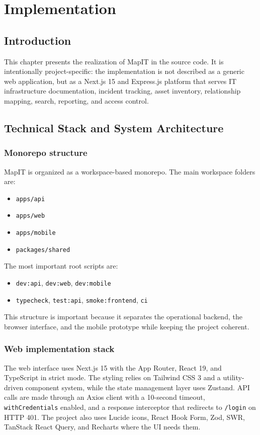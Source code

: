 \chapter{Implementation}

\section{Introduction}
This chapter presents the realization of MapIT in the source code. It is intentionally project-specific: the implementation is not described as a generic web application, but as a Next.js 15 and Express.js platform that serves IT infrastructure documentation, incident tracking, asset inventory, relationship mapping, search, reporting, and access control.

\section{Technical Stack and System Architecture}
\subsection{Monorepo structure}
MapIT is organized as a workspace-based monorepo. The main workspace folders are:
\begin{itemize}
	\item \texttt{apps/api}
	\item \texttt{apps/web}
	\item \texttt{apps/mobile}
	\item \texttt{packages/shared}
\end{itemize}
The most important root scripts are:
\begin{itemize}
	\item \texttt{dev:api}, \texttt{dev:web}, \texttt{dev:mobile}
	\item \texttt{typecheck}, \texttt{test:api}, \texttt{smoke:frontend}, \texttt{ci}
\end{itemize}
This structure is important because it separates the operational backend, the browser interface, and the mobile prototype while keeping the project coherent.

\subsection{Web implementation stack}
The web interface uses Next.js 15 with the App Router, React 19, and TypeScript in strict mode. The styling relies on Tailwind CSS 3 and a utility-driven component system, while the state management layer uses Zustand. API calls are made through an Axios client with a 10-second timeout, \texttt{withCredentials} enabled, and a response interceptor that redirects to \texttt{/login} on HTTP 401. The project also uses Lucide icons, React Hook Form, Zod, SWR, TanStack React Query, and Recharts where the UI needs them.

